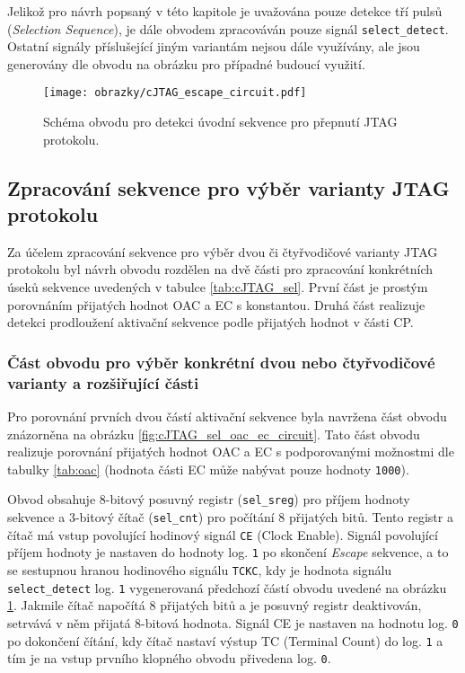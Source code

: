 Jelikož pro návrh popsaný v této kapitole je uvažována pouze detekce tří pulsů (\textit{Selection Sequence}), je dále obvodem zpracováván pouze signál \texttt{select\_detect}. Ostatní signály příslušející jiným variantám nejsou dále využívány, ale jsou generovány dle obvodu na obrázku pro případné budoucí využití.

\begin{figure}[!h]
  \begin{center}
    \texttt{[image: obrazky/cJTAG\_escape\_circuit.pdf]}
  \end{center}
  \caption{Schéma obvodu pro detekci úvodní sekvence pro přepnutí \acs{JTAG} protokolu.}
	\label{fig:cJTAG_escape_circuit}
\end{figure}

\subsection{Zpracování sekvence pro výběr varianty \acs{JTAG} protokolu}	\label{subsec:sel_seq_det}
Za účelem zpracování sekvence pro výběr dvou či čtyřvodičové varianty \acs{JTAG} protokolu byl návrh obvodu rozdělen na dvě části pro zpracování konkrétních úseků sekvence uvedených v tabulce \ref{tab:cJTAG_sel}. První část je prostým porovnáním přijatých hodnot \acs{OAC} a \acs{EC} s konstantou. Druhá část realizuje detekci prodloužení aktivační sekvence podle přijatých hodnot v části \acs{CP}.

\subsubsection{Část obvodu pro výběr konkrétní dvou nebo čtyřvodičové varianty a rozšiřující části}
Pro porovnání prvních dvou částí aktivační sekvence byla navržena část obvodu znázorněna na obrázku \ref{fig:cJTAG_sel_oac_ec_circuit}. Tato část obvodu realizuje porovnání přijatých hodnot \acs{OAC} a \acs{EC} s podporovanými možnostmi dle tabulky \ref{tab:oac} (hodnota části \acs{EC} může nabývat pouze hodnoty \texttt{1000}).

Obvod obsahuje 8-bitový posuvný registr (\texttt{sel\_sreg}) pro příjem hodnoty sekvence a 3-bitový čítač (\texttt{sel\_cnt}) pro počítání 8 přijatých bitů. Tento registr a čítač má vstup povolující hodinový signál \texttt{CE} (Clock Enable). Signál povolující příjem hodnoty je nastaven do hodnoty log. \texttt{1} po skončení \textit{Escape} sekvence, a to se sestupnou hranou hodinového signálu \texttt{\acs{TCKC}}, kdy je hodnota signálu \texttt{select\_detect} log. \texttt{1} vygenerovaná předchozí částí obvodu uvedené na obrázku \ref{fig:cJTAG_escape_circuit}. Jakmile čítač napočítá 8 přijatých bitů a je posuvný registr deaktivován, setrvává v něm přijatá 8-bitová hodnota. Signál CE je nastaven na hodnotu log. \texttt{0} po dokončení čítání, kdy čítač nastaví výstup TC (Terminal Count) do log. \texttt{1} a tím je na vstup prvního klopného obvodu přivedena log. \texttt{0}.

